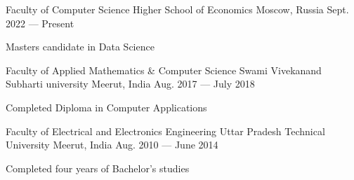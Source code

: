 
\begin{cventries}

%

\cventry
{Faculty of Computer Science}
{Higher School of Economics}
{Moscow, Russia}
{Sept. 2022 --- Present}
{
	\begin{cvitems}
	 {Masters candidate in Data Science}
	\end{cvitems}
}

\cventry
{Faculty of Applied Mathematics \& Computer Science}
{Swami Vivekanand Subharti university}
{Meerut, India}
{Aug. 2017 --- July 2018}
{
	\begin{cvitems}
		 {Completed Diploma in Computer Applications}
	\end{cvitems}
}

\cventry
{Faculty of Electrical and Electronics Engineering} 
{Uttar Pradesh Technical University} 
{Meerut, India} 
{Aug. 2010 --- June 2014} 
{	
	\begin{cvitems} 
	 {Completed four years of Bachelor's studies}
	\end{cvitems}
}

\end{cventries}